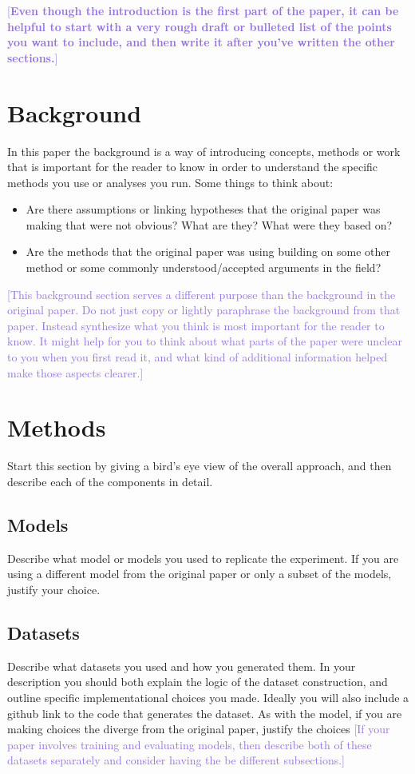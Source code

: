 \documentclass[11pt]{article}
\newcommand{\advice}[1]{\textcolor{MediumPurple}{[#1]}}
\begin{document}
\noindent\advice{\textbf{Even though the introduction is the first part of the paper, it can be helpful to start with a very rough draft or bulleted list of the points you want to include, and then write it after you've written the other sections.}}



\section{Background}
In this paper the background is a way of introducing concepts, methods or work that is important for the reader to know in order to understand the specific methods you use or analyses you run. Some things to think about:

\begin{itemize}
    \item Are there assumptions or linking hypotheses that the original paper was making that were not obvious? What are they? What were they based on?
    \item Are the methods that the original paper was using building on some other method or some commonly understood/accepted arguments in the field?
\end{itemize}

\advice{This background section serves a different purpose than the background in the original paper. Do not just copy or lightly paraphrase the background from that paper. Instead synthesize what you think is most important for the reader to know. It might help for you to think about what parts of the paper were unclear to you when you first read it, and what kind of additional information helped make those aspects clearer.}


\section{Methods}
Start this section by giving a bird's eye view of the overall approach, and then describe each of the components in detail.

\subsection{Models}
Describe what model or models you used to replicate the experiment. If you are using a different model from the original paper or only a subset of the models, justify your choice.

\subsection{Datasets}
Describe what datasets you used and how you generated them. In your description you should both explain the logic of the dataset construction, and outline specific implementational choices you made. Ideally you will also include a github link to the code that generates the dataset. As with the model, if you are making choices the diverge from the original paper, justify the choices \advice{If your paper involves training and evaluating models, then describe both of these datasets separately and consider having the be different subsections.}
\end{document}
